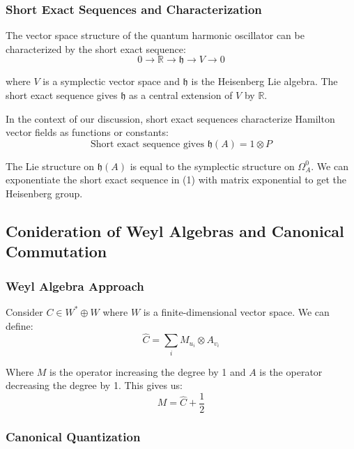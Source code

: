 \subsubsection{Short Exact Sequences and Characterization}

The vector space structure of the quantum harmonic oscillator can be characterized by the short exact sequence:
\begin{equation}
0 \rightarrow \mathbb{R} \rightarrow \mathfrak{h} \rightarrow V \rightarrow 0
\end{equation}

where $V$ is a symplectic vector space and $\mathfrak{h}$ is the Heisenberg Lie algebra. The short exact sequence gives $\mathfrak{h}$ as a central extension of $V$ by $\mathbb{R}$.

In the context of our discussion, short exact sequences characterize Hamilton vector fields as functions or constants:
\begin{equation}
\text{Short exact sequence gives } \mathfrak{h}(A) = 1 \otimes P
\end{equation}

The Lie structure on $\mathfrak{h}(A)$ is equal to the symplectic structure on $\Omega_A^0$. We can exponentiate the short exact sequence in (1) with matrix exponential to get the Heisenberg group.

\subsection{Conideration of Weyl Algebras and Canonical Commutation}

\subsubsection{Weyl Algebra Approach}

Consider $C \in W^* \oplus W$ where $W$ is a finite-dimensional vector space. We can define:
\begin{equation}
\hat{C} = \sum_i M_{u_i} \otimes A_{v_i}
\end{equation}

Where $M$ is the operator increasing the degree by 1 and $A$ is the operator decreasing the degree by 1. This gives us:
\begin{equation}
M = \hat{C} + \frac{1}{2}
\end{equation}

\subsubsection{Canonical Quantization}


